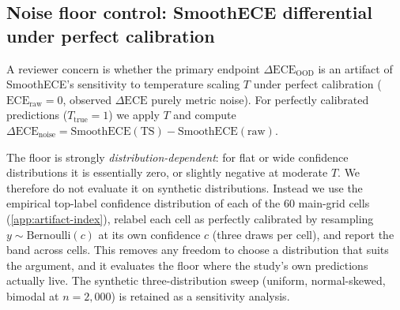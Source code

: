 \documentclass[final,5p,times,nonatbib]{elsarticle}
\begin{document}
\subsection{Noise floor control: SmoothECE differential under perfect calibration}
\label{sec:noise_floor}
A reviewer concern is whether the primary endpoint
$\Delta\text{ECE}_{\text{OOD}}$ is an artifact of SmoothECE's
sensitivity to temperature scaling $T$ under perfect calibration
($\text{ECE}_{\text{raw}} = 0$, observed $\Delta\text{ECE}$ purely
metric noise). For perfectly calibrated predictions
($T_{\text{true}}=1$) we apply $T$ and compute
$\Delta\text{ECE}_{\text{noise}} = \text{SmoothECE}(\text{TS}) - \text{SmoothECE}(\text{raw})$.

The floor is strongly \emph{distribution-dependent}: for flat or wide
confidence distributions it is essentially zero, or slightly negative at
moderate $T$. We therefore do not evaluate it on synthetic
distributions. Instead we use the empirical top-label confidence
distribution of each of the 60 main-grid cells
(\ref{app:artifact-index}), relabel each cell as
perfectly calibrated by resampling $y \sim \mathrm{Bernoulli}(c)$ at its
own confidence $c$ (three draws per cell), and report the band across
cells. This removes any freedom to choose a distribution that suits the
argument, and it evaluates the floor where the study's own predictions
actually live. The synthetic three-distribution sweep (uniform,
normal-skewed, bimodal at $n=2{,}000$) is retained as a sensitivity
analysis.
\end{document}
